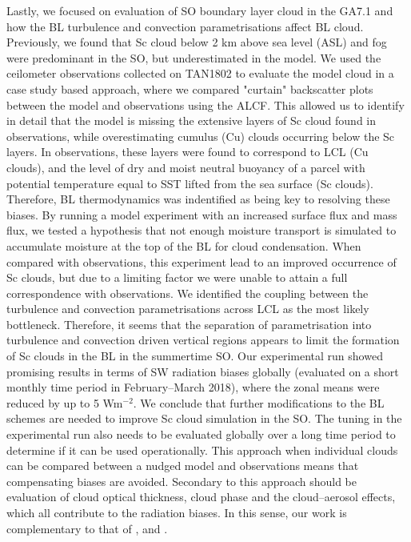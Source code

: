 Lastly, we focused on evaluation of SO boundary layer cloud in the GA7.1
and how the BL turbulence and convection parametrisations affect
BL cloud. Previously, we found that Sc cloud below 2 km above sea level (ASL)
and fog were predominant in the SO, but underestimated in the model. We used
the ceilometer observations collected on TAN1802 to evaluate the model cloud
in a case study based approach, where we compared "curtain" backscatter plots
between the model and observations using the ALCF. This allowed us to identify
in detail that the model is missing the extensive layers of Sc cloud found
in observations, while overestimating cumulus (Cu) clouds occurring below the
Sc layers. In observations, these layers were found to correspond to LCL (Cu clouds),
and the level of dry and moist neutral buoyancy of a parcel with potential temperature
equal to SST lifted from the sea surface (Sc clouds). Therefore, BL
thermodynamics was indentified as being key to resolving these biases. By running
a model experiment with an increased surface flux and mass flux, we tested
a hypothesis that not enough moisture transport is simulated to accumulate
moisture at the top of the BL for cloud condensation. When compared with
observations, this experiment lead to an improved occurrence of Sc clouds,
but due to a limiting factor we were unable to attain a full correspondence
with observations. We identified the coupling between the turbulence and convection
parametrisations across LCL as the most likely bottleneck. Therefore, it seems
that the separation of parametrisation into turbulence and convection driven
vertical regions appears to limit the formation of Sc clouds in the BL in the
summertime SO. Our experimental run showed promising results in terms of
SW radiation biases globally (evaluated on a short monthly time period in February--March 2018),
where the zonal means were reduced by up to 5 Wm$^{-2}$. We conclude that
further modifications to the BL schemes are needed to improve
Sc cloud simulation in the SO. The tuning in the experimental run also needs to
be evaluated globally over a long time period to determine if it can be used
operationally. This approach when individual clouds can be compared between
a nudged model and observations means that compensating biases are avoided.
Secondary to this approach should be evaluation of cloud optical thickness,
cloud phase and the cloud--aerosol effects, which all contribute to the
radiation biases. In this sense, our work is complementary to that of
\cite{revell2019}, \cite{hartery2020a} and \cite{hartery2020b}.

